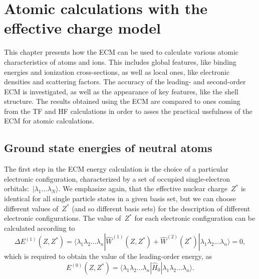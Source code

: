 \chapter{Atomic calculations with the effective charge model}
\label{ch:Applications}

This chapter presents how the ECM can be used to calculate various atomic characteristics of atoms and ions. This includes global features, like binding energies and ionization cross-sections, as well as local ones, like electronic densities and scattering factors. The accuracy of the leading- and second-order ECM is investigated, as well as the appearance of key features, like the shell structure. The results obtained using the ECM are compared to ones coming from the TF and HF calculations in order to asses the practical usefulness of the ECM for atomic calculations.

\section{Ground state energies of neutral atoms}
\label{sec:ground-state-energ}

The first step in the ECM energy calculation is the choice of a particular electronic configuration, characterized by a set of occupied single-electron orbitals:~$|\lambda_1 ... \lambda_N \rangle$. We emphasize again, that the effective nuclear charge~$Z^*$ is identical for all single particle states in a given basis set, but we can choose different values of~$Z^*$ (and so different basis sets) for the description of different electronic configurations. The value of~$Z^*$ for each electronic configuration can be calculated according to
\begin{equation}
\Delta E^{(1)} (Z,Z^*) = \langle \lambda_1 \lambda_2 ... \lambda_n |
\widehat{W}^{(1)}(Z,Z^*)+\widehat{W}^{(2)}(Z^*) | \lambda_1 \lambda_2... \lambda_n \rangle = 0,
\end{equation}
which is required to obtain the value of the leading-order energy, as
\begin{equation}
E^{(0)} (Z,Z^*) = \langle \lambda_1 \lambda_2 ... \lambda_n |
\widehat{H}_0 | \lambda_1 \lambda_2... \lambda_n \rangle.
\end{equation}

